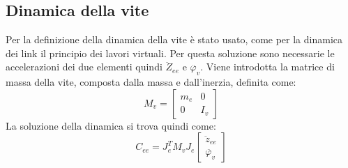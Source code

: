 \subsection{Dinamica della vite}
Per la definizione della dinamica della vite è stato usato, come per la dinamica dei link il principio dei lavori virtuali. Per questa soluzione sono necessarie le accelerazioni dei due elementi quindi $\ddot{Z}_{ee}$ e $\ddot{\varphi_v}$. Viene introdotta la matrice di massa della vite, composta dalla massa e dall'inerzia, definita come:
\begin{equation}
	M_v = \begin{bmatrix}
	m_e & 0 \\ 0 & I_v
	\end{bmatrix}
\end{equation} 
La soluzione della dinamica si trova quindi come:
\begin{equation}
    C_{ee} = J_e^TM_v
    J_e \begin{bmatrix}
    \ddot{z}_{ee} \\ \ddot{\varphi_v}
    \end{bmatrix}
\end{equation}
